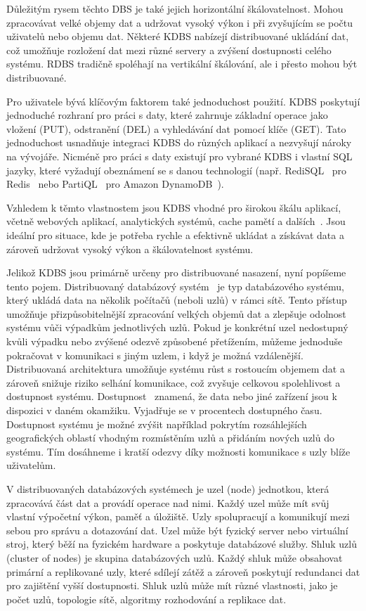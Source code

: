 \documentclass[czech,master,dept460,male,csharp,cpdeclaration]{diploma}
\begin{document}
	Důležitým rysem těchto DBS je také jejich horizontální škálovatelnost. Mohou zpracovávat velké objemy dat a udržovat vysoký výkon i při zvyšujícím se počtu uživatelů nebo objemu dat. Některé KDBS nabízejí distribuované ukládání dat, což umožňuje rozložení dat mezi různé servery a zvýšení dostupnosti celého systému. RDBS tradičně spoléhají na vertikální škálování, ale i přesto mohou být distribuované.
	
	Pro uživatele bývá klíčovým faktorem také jednoduchost použití. KDBS poskytují jednoduché rozhraní pro práci s daty, které zahrnuje základní operace jako vložení (PUT), odstranění (DEL) a vyhledávání dat pomocí klíče (GET). Tato jednoduchost usnadňuje integraci KDBS do různých aplikací a nezvyšují nároky na vývojáře. Nicméně pro práci s daty existují pro vybrané KDBS i vlastní SQL jazyky, které vyžadují obeznámení se s danou technologií (např. RediSQL~\cite{redisql} pro Redis~\cite{redis} nebo PartiQL~\cite{partiql} pro Amazon DynamoDB~\cite{dynamodb}).
	
	Vzhledem k těmto vlastnostem jsou KDBS vhodné pro širokou škálu aplikací, včetně webových aplikací, analytických systémů, cache pamětí a dalších~\cite{kdbs-memory, common-use-kdbs}. Jsou ideální pro situace, kde je potřeba rychle a efektivně ukládat a získávat data a zároveň udržovat vysoký výkon a škálovatelnost systému.
	
	Jelikož KDBS jsou primárně určeny pro distribuované nasazení, nyní popíšeme tento pojem. Distribuovaný databázový systém~\cite{ddbs} je typ databázového systému, který ukládá data na několik počítačů (neboli uzlů) v rámci sítě. Tento přístup umožňuje přizpůsobitelnější zpracování velkých objemů dat a zlepšuje odolnost systému vůči výpadkům jednotlivých uzlů. Pokud je konkrétní uzel nedostupný kvůli výpadku nebo zvýšené odezvě způsobené přetížením, můžeme jednoduše pokračovat v komunikaci s jiným uzlem, i když je možná vzdálenější. Distribuovaná architektura umožňuje systému růst s rostoucím objemem dat a zároveň snižuje riziko selhání komunikace, což zvyšuje celkovou spolehlivost a dostupnost systému. Dostupnost~\cite{availability} znamená, že data nebo jiné zařízení jsou k dispozici v daném okamžiku. Vyjadřuje se v procentech dostupného času. Dostupnost systému je možné zvýšit například pokrytím rozsáhlejších geografických oblastí vhodným rozmístěním uzlů a přidáním nových uzlů do systému. Tím dosáhneme i kratší odezvy díky možnosti komunikace s uzly blíže uživatelům.
	
	V distribuovaných databázových systémech je uzel (node) jednotkou, která zpracovává část dat a provádí operace nad nimi. Každý uzel může mít svůj vlastní výpočetní výkon, paměť a úložiště. Uzly spolupracují a komunikují mezi sebou pro správu a dotazování dat. Uzel může být fyzický server nebo virtuální stroj, který běží na fyzickém hardware a poskytuje databázové služby. Shluk uzlů (cluster of nodes) je skupina databázových uzlů. Každý shluk může obsahovat primární a replikované uzly, které sdílejí zátěž a zároveň poskytují redundanci dat pro zajištění vyšší dostupnosti. Shluk uzlů může mít různé vlastnosti, jako je počet uzlů, topologie sítě, algoritmy rozhodování a replikace dat.
	
\end{document}
